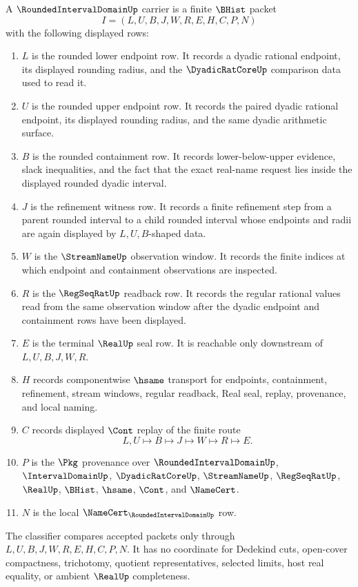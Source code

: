 \begin{definition}
\label{def:rounded-interval-domain-carrier}
A $\RoundedIntervalDomainUp$ carrier is a finite $\BHist$ packet
$$
I=(L,U,B,J,W,R,E,H,C,P,N)
$$
with the following displayed rows:
\begin{enumerate}
\item $L$ is the rounded lower endpoint row. It records a dyadic rational endpoint, its displayed rounding radius, and the $\DyadicRatCoreUp$ comparison data used to read it.
\item $U$ is the rounded upper endpoint row. It records the paired dyadic rational endpoint, its displayed rounding radius, and the same dyadic arithmetic surface.
\item $B$ is the rounded containment row. It records lower-below-upper evidence, slack inequalities, and the fact that the exact real-name request lies inside the displayed rounded dyadic interval.
\item $J$ is the refinement witness row. It records a finite refinement step from a parent rounded interval to a child rounded interval whose endpoints and radii are again displayed by $L,U,B$-shaped data.
\item $W$ is the $\StreamNameUp$ observation window. It records the finite indices at which endpoint and containment observations are inspected.
\item $R$ is the $\RegSeqRatUp$ readback row. It records the regular rational values read from the same observation window after the dyadic endpoint and containment rows have been displayed.
\item $E$ is the terminal $\RealUp$ seal row. It is reachable only downstream of $L,U,B,J,W,R$.
\item $H$ records componentwise $\hsame$ transport for endpoints, containment, refinement, stream windows, regular readback, Real seal, replay, provenance, and local naming.
\item $C$ records displayed $\Cont$ replay of the finite route
$$
L,U \longmapsto B \longmapsto J \longmapsto W \longmapsto R \longmapsto E .
$$
\item $P$ is the $\Pkg$ provenance over $\RoundedIntervalDomainUp$, $\IntervalDomainUp$, $\DyadicRatCoreUp$, $\StreamNameUp$, $\RegSeqRatUp$, $\RealUp$, $\BHist$, $\hsame$, $\Cont$, and $\NameCert$.
\item $N$ is the local $\NameCert_{\RoundedIntervalDomainUp}$ row.
\end{enumerate}
The classifier compares accepted packets only through $L,U,B,J,W,R,E,H,C,P,N$. It has no coordinate for Dedekind cuts, open-cover compactness, trichotomy, quotient representatives, selected limits, host real equality, or ambient $\RealUp$ completeness.
\end{definition}

